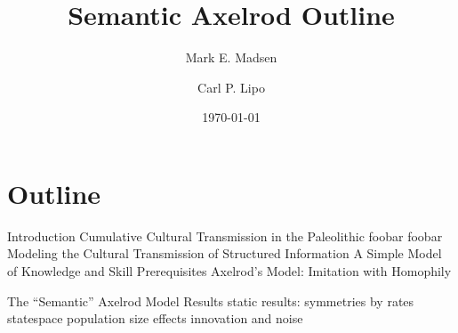 \documentclass[preprint,nofootinbib,titlepage,groupedaddress,aip,author-year]{revtex4-1}
\begin{document}

\title{Semantic Axelrod Outline} %



\author{Mark E. Madsen}

\author{Carl P. Lipo}


\date{\today}




\maketitle %

\singlespacing


\section{Outline}

\begin{outline}[enumerate]
	\1 Introduction
    \1 Cumulative Cultural Transmission in the Paleolithic
        \2  foobar
        \2  foobar
    \1 Modeling the Cultural Transmission of Structured Information
        \2 A Simple Model of Knowledge and Skill Prerequisites
        \2 Axelrod's Model: Imitation with Homophily

       	\lipsum[1]

        \2 The ``Semantic'' Axelrod Model
    \1 Results
        \2  static results:  symmetries by rates ~ statespace
        \2  population size effects
        \2  innovation and noise
\end{outline}

\singlespacing
{}
{}
\renewcommand{\bibfont}{\small}


\end{document}
